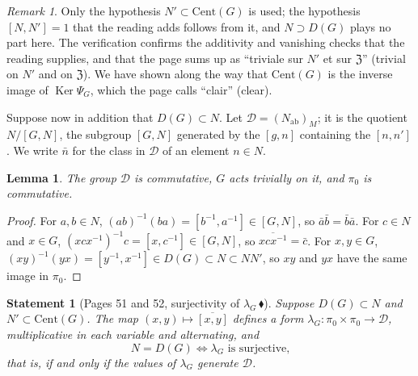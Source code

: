 \documentclass[11pt]{article}
\newcommand{\q}[1]{“#1”}
\newcommand{\piste}[1]{\,\href{https://grothendieck.commutator.io/findings/\##1}{\textcolor{piste}{\ensuremath{\blacklozenge}}}}
\theoremstyle{plain}
\newtheorem*{enonce}{Statement}
\newtheorem{lemme}{Lemma}[section]
\theoremstyle{definition}
\theoremstyle{remark}
\newtheorem*{remarque}{Remark}
\begin{document}
\begin{remarque}
Only the hypothesis $N' \subset \mathrm{Cent}(G)$ is used; the hypothesis $[N, N'] = 1$ that the reading adds follows from it, and $N \supset D(G)$ plays no part here. The verification confirms the additivity and vanishing checks that the reading supplies, and that the page sums up as \q{triviale sur $N'$ et sur $\mathfrak Z$} (trivial on $N'$ and on $\mathfrak Z$). We have shown along the way that $\mathrm{Cent}(G)$ is the inverse image of $\operatorname{Ker}\Psi_G$, which the page calls \q{clair} (clear).
\end{remarque}

Suppose now in addition that $D(G) \subset N$. Let $\mathcal D = (N_{\mathrm{ab}})_M$; it is the quotient $N/[G, N]$, the subgroup $[G, N]$ generated by the $[g, n]$ containing the $[n, n']$. We write $\bar n$ for the class in $\mathcal D$ of an element $n \in N$.

\begin{lemme}\label{lem:133-D}
The group $\mathcal D$ is commutative, $G$ acts trivially on it, and $\pi_0$ is commutative.
\end{lemme}

\begin{proof}
For $a, b \in N$, $(ab)^{-1}(ba) = [b^{-1}, a^{-1}] \in [G, N]$, so $\bar a\bar b = \bar b\bar a$. For $c \in N$ and $x \in G$, $(xcx^{-1})^{-1}c = [x, c^{-1}] \in [G, N]$, so $\overline{xcx^{-1}} = \bar c$. For $x, y \in G$, $(xy)^{-1}(yx) = [y^{-1}, x^{-1}] \in D(G) \subset N \subset NN'$, so $xy$ and $yx$ have the same image in $\pi_0$.
\end{proof}

\begin{enonce}[Pages 51 and 52, surjectivity of $\lambda_G$\piste{133-centre-and-derived-group-from-two-crossed-modules}]
Suppose $D(G) \subset N$ and $N' \subset \mathrm{Cent}(G)$. The map $(x, y) \mapsto \overline{[x, y]}$ defines a form $\lambda_G : \pi_0 \times \pi_0 \to \mathcal D$, multiplicative in each variable and alternating, and
\[
N = D(G) \iff \lambda_G \text{ is surjective,}
\]
that is, if and only if the values of $\lambda_G$ generate $\mathcal D$.
\end{enonce}
\end{document}
